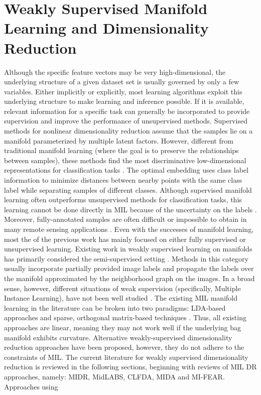 \section{Weakly Supervised Manifold Learning and Dimensionality Reduction} \label{sec:weakly_sup_dim_reduction}
Although the specific feature vectors may be very high-dimensional, the underlying structure of a given dataset set is usually governed by only a few variables. Either implicitly or explicitly, most learning algorithms exploit this underlying structure to make learning and inference possible.
If it is available, relevant information for a specific task can generally be incorporated to provide supervision and improve the performance of unsupervised methods.  Supervised methods for nonlinear dimensionality reduction assume that the samples lie on a manifold parameterized by multiple latent factors.  However, different from traditional manifold learning (where the goal is to preserve the relationships between samples), these methods find the most discriminative low-dimensional representations for classification tasks \citep{Wu2015MILImageManifoldThesis}.  The optimal embedding uses class label information to  minimize distances between nearby points with the same class label while separating samples of different classes.  Although supervised manifold learning often outperforms unsupervised methods for classification tasks, this learning cannot be done directly in  MIL because of the uncertainty on the labels \citep{Carbonneau2016MILSurvey}.  Moreover, fully-annotated samples are often difficult or impossible to obtain in many remote sensing applications \citep{Zare2016MIACE}.  Even with the successes of manifold learning, most the of the previous work has mainly focused on either fully supervised or unsupervised learning.   Existing work in weakly supervised learning on manifolds has primarily considered the semi-supervised setting \citep{Zhang2008SpectralSemiSupManifoldLearning,Chen2018RobustSemiSupManifoldLearning,Zhang2014SemiSupManLearningFusion,Hong2019LearnableManifoldAlignment,Navaratnam2007JointManifoldSemiSupRegression,Stanley2019ManAlignmentFeatureCorrespondence,Tuia2015KernelManifoldAlignment,Wang2010MultiscaleManAlignment,Wang2011HeteroDomainAdaptationManAlignment}.  Methods in this category usually incorporate partially provided image labels and propagate the labels over the manifold approximated by the neighborhood graph on the images.  In a broad sense, however, different situations of weak supervision (specifically, Multiple Instance  Learning), have not been well studied \citep{Wu2015MILImageManifoldThesis}.  The existing MIL manifold learning in the literature can be broken into two paradigms: LDA-based approaches and sparse, orthogonal matrix-based techniques \citep{Zhu2018MIDRSparsity}. Thus, all existing approaches are linear, meaning they may not work well if the underlying bag manifold exhibits curvature.  Alternative weakly-supervised dimensionality reduction approaches have been proposed, however, they do not adhere to the constraints of MIL.  The current literature for weakly supervised dimensionality reduction is reviewed in the following sections, beginning with reviews of MIL DR approaches, namely: MIDR, MidLABS, CLFDA, MIDA and MI-FEAR.  Approaches using 